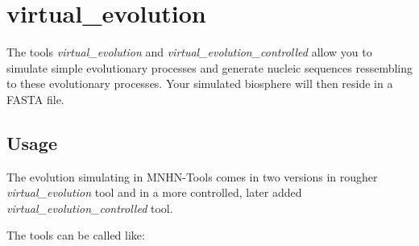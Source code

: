 \section{virtual\_evolution} \label{sec-virtual-ev}

The tools \emph{virtual\_evolution} and
\emph{virtual\_evolution\_controlled} allow you to simulate simple
evolutionary processes and generate nucleic sequences ressembling to
these evolutionary processes. Your simulated biosphere will then
reside in a FASTA file.

\subsection{Usage}

The evolution simulating in MNHN-Tools comes in two versions in
rougher \emph{virtual\_evolution} tool and in a more controlled, later
added \emph{virtual\_evolution\_controlled} tool.

The tools can be called like:

